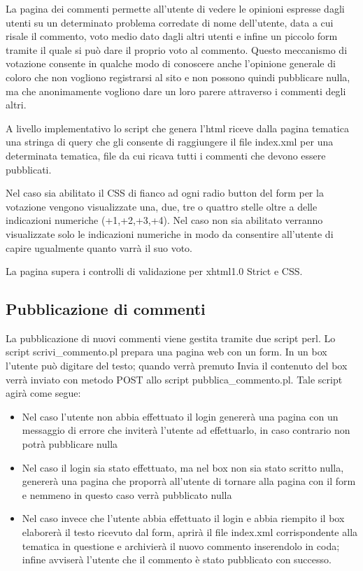 \documentclass[a4paper,10pt]{article}
\begin{document}
La pagina dei commenti permette all'utente di vedere le opinioni espresse dagli utenti su un determinato problema
 corredate di nome dell'utente, data a cui risale il commento, voto medio dato dagli altri utenti e infine un piccolo 
form tramite il quale si pu\`o dare il proprio voto al commento. Questo meccanismo di votazione consente in qualche modo di conoscere anche l'opinione generale di coloro che non vogliono registrarsi al sito e non possono quindi pubblicare nulla, ma che anonimamente vogliono dare un loro parere attraverso i commenti degli altri.

A livello implementativo lo script che genera l'html riceve dalla pagina tematica una stringa di query che gli consente di raggiungere il file index.xml per una determinata tematica, file da cui ricava tutti i commenti che devono essere pubblicati.

Nel caso sia abilitato il CSS di fianco ad ogni radio button del form per la votazione vengono visualizzate una, due, tre o quattro stelle oltre a delle indicazioni numeriche (+1,+2,+3,+4). Nel caso non sia abilitato verranno visualizzate solo le indicazioni numeriche in modo da consentire all'utente di capire ugualmente quanto varr\`a il suo voto.

La pagina supera i controlli di validazione per xhtml1.0 Strict e CSS.

\subsection{Pubblicazione di commenti}

La pubblicazione di nuovi commenti viene gestita tramite due script perl. Lo script scrivi{\_}commento.pl prepara una pagina web con un form. In un box l'utente pu\`o digitare del testo; quando verr\`a premuto Invia il contenuto del box verr\`a inviato con metodo POST allo script pubblica{\_}commento.pl. Tale script agir\`a come segue:
\begin{itemize}
\item Nel caso l'utente non abbia effettuato il login generer\`a una pagina con un messaggio di errore che inviter\`a l'utente ad effettuarlo, in caso contrario non potr\`a pubblicare nulla
\item Nel caso il login sia stato effettuato, ma nel box non sia stato scritto nulla, generer\`a una pagina che proporr\`a all'utente di tornare alla pagina con il form e nemmeno in questo caso verr\`a pubblicato nulla
\item Nel caso invece che l'utente abbia effettuato il login e abbia riempito il box elaborer\`a il testo ricevuto dal form, aprir\`a il file index.xml corrispondente alla tematica in questione e archivier\`a il nuovo commento inserendolo in coda; infine avviser\`a l'utente che il commento \`e stato pubblicato con successo.
\end{itemize}
\end{document}

